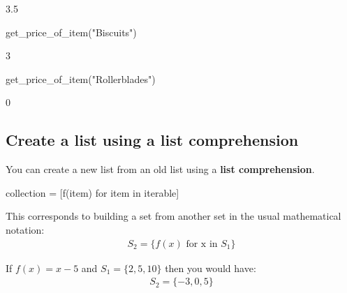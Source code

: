 \begin{raw}
3.5
\end{raw}







\begin{pyin}
get_price_of_item("Biscuits")
\end{pyin}





\begin{raw}
3
\end{raw}







\begin{pyin}
get_price_of_item("Rollerblades")
\end{pyin}





\begin{raw}
0
\end{raw}





\subsection{Create a list using a list comprehension}
\label{sec:create_a_list_using_a_list_comprehension}

You can create a new list from an old list using a \textbf{list comprehension}.


\begin{api}
collection = [f(item) for item in iterable]
\end{api}



This corresponds to building a set from another set in the usual mathematical
notation:
\begin{equation*}
\begin{split}
S_2 = \{f(x)\text{ for x in }S_1\}
\end{split}
\end{equation*}

If \(f(x)=x - 5\) and \(S_1=\{2, 5, 10\}\) then you would have:
\begin{equation*}
\begin{split}
S_2 = \{-3, 0, 5\}
\end{split}
\end{equation*}

